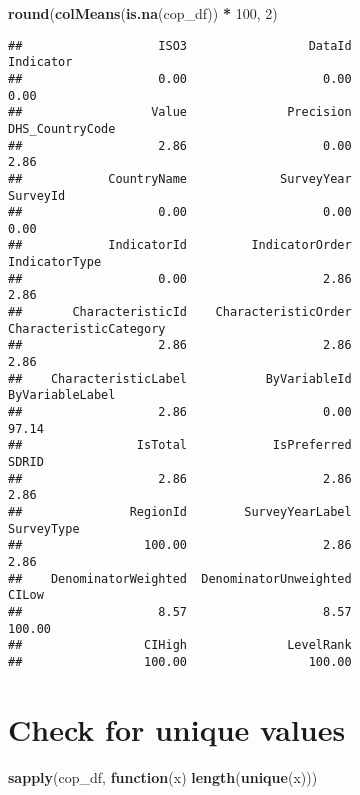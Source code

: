 \documentclass[
]{article}
\newenvironment{Shaded}{\begin{snugshade}}{\end{snugshade}}
\newcommand{\ControlFlowTok}[1]{\textcolor[rgb]{0.13,0.29,0.53}{\textbf{#1}}}
\newcommand{\DecValTok}[1]{\textcolor[rgb]{0.00,0.00,0.81}{#1}}
\newcommand{\FunctionTok}[1]{\textcolor[rgb]{0.13,0.29,0.53}{\textbf{#1}}}
\newcommand{\NormalTok}[1]{#1}
\newcommand{\SpecialCharTok}[1]{\textcolor[rgb]{0.81,0.36,0.00}{\textbf{#1}}}
\begin{document}
\begin{Shaded}
\begin{Highlighting}[]
\FunctionTok{round}\NormalTok{(}\FunctionTok{colMeans}\NormalTok{(}\FunctionTok{is.na}\NormalTok{(cop\_df)) }\SpecialCharTok{*} \DecValTok{100}\NormalTok{, }\DecValTok{2}\NormalTok{)}
\end{Highlighting}
\end{Shaded}

\begin{verbatim}
##                   ISO3                 DataId              Indicator 
##                   0.00                   0.00                   0.00 
##                  Value              Precision        DHS_CountryCode 
##                   2.86                   0.00                   2.86 
##            CountryName             SurveyYear               SurveyId 
##                   0.00                   0.00                   0.00 
##            IndicatorId         IndicatorOrder          IndicatorType 
##                   0.00                   2.86                   2.86 
##       CharacteristicId    CharacteristicOrder CharacteristicCategory 
##                   2.86                   2.86                   2.86 
##    CharacteristicLabel           ByVariableId        ByVariableLabel 
##                   2.86                   0.00                  97.14 
##                IsTotal            IsPreferred                  SDRID 
##                   2.86                   2.86                   2.86 
##               RegionId        SurveyYearLabel             SurveyType 
##                 100.00                   2.86                   2.86 
##    DenominatorWeighted  DenominatorUnweighted                  CILow 
##                   8.57                   8.57                 100.00 
##                 CIHigh              LevelRank 
##                 100.00                 100.00
\end{verbatim}

\section{Check for unique values}\label{check-for-unique-values}

\begin{Shaded}
\begin{Highlighting}[]
\FunctionTok{sapply}\NormalTok{(cop\_df, }\ControlFlowTok{function}\NormalTok{(x) }\FunctionTok{length}\NormalTok{(}\FunctionTok{unique}\NormalTok{(x)))}
\end{Highlighting}
\end{Shaded}
\end{document}
